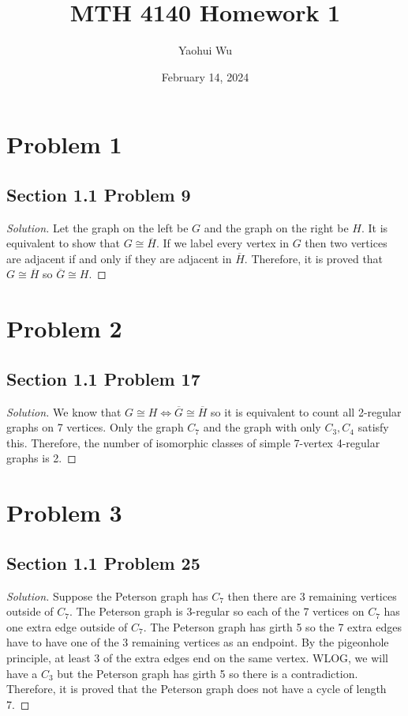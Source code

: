 \documentclass[12pt, letterpaper]{article}
\title{MTH 4140 Homework 1}
\author{Yaohui Wu}
\date{February 14, 2024}
\newenvironment{solution}{\begin{proof}[Solution]}{\end{proof}}
\begin{document}
\maketitle
\section*{Problem 1}
\subsection*{Section 1.1 Problem 9}
\begin{solution}
    Let the graph on the left be \(G\) and the graph on the right be \(H\). It
    is equivalent to show that \(G\cong\overline{H}\). If we label every vertex
    in \(G\) then two vertices are adjacent if and only if they are adjacent in
    \(\overline{H}\). Therefore, it is proved that \(G\cong\overline{H}\) so
    \(\overline{G}\cong H\).
\end{solution}

\section*{Problem 2}
\subsection*{Section 1.1 Problem 17}
\begin{solution}
    We know that \(G\cong H\iff\overline{G}\cong\overline{H}\) so it is
    equivalent to count all 2-regular graphs on 7 vertices. Only the graph
    \(C_7\) and the graph with only \(C_3,C_4\) satisfy this. Therefore, the
    number of isomorphic classes of simple 7-vertex 4-regular graphs is 2.
\end{solution}

\section*{Problem 3}
\subsection*{Section 1.1 Problem 25}
\begin{solution}
    Suppose the Peterson graph has \(C_7\) then there are 3 remaining vertices
    outside of \(C_7\). The Peterson graph is 3-regular so each of the 7
    vertices on \(C_7\) has one extra edge outside of \(C_7\). The Peterson
    graph has girth 5 so the 7 extra edges have to have one of the 3 remaining
    vertices as an endpoint. By the pigeonhole principle, at least 3 of the
    extra edges end on the same vertex. WLOG, we will have a \(C_3\) but the
    Peterson graph has girth 5 so there is a contradiction. Therefore, it is
    proved that the Peterson graph does not have a cycle of length 7.
\end{solution}
\end{document}

